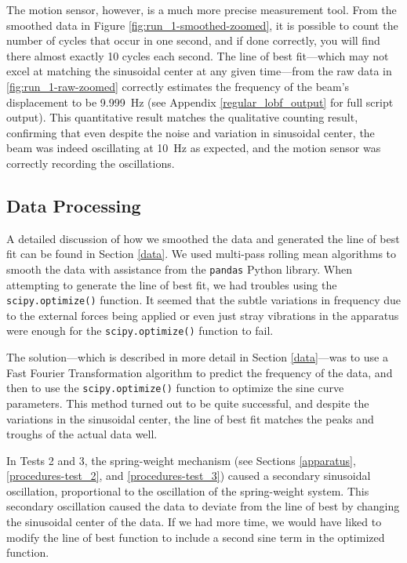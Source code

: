 \documentclass[12 pt]{report}
\begin{document}
The motion sensor, however, is a much more precise measurement tool. From the smoothed data in Figure \ref{fig:run_1-smoothed-zoomed}, it is possible to count the number of cycles that occur in one second, and if done correctly, you will find there almost exactly \num{10} cycles each second. The line of best fit---which may not excel at matching the sinusoidal center at any given time---from the raw data in \ref{fig:run_1-raw-zoomed} correctly estimates the frequency of the beam's displacement to be \qty{9.999}{\hertz} (see Appendix \ref{regular_lobf_output} for full script output). This quantitative result matches the qualitative counting result, confirming that even despite the noise and variation in sinusoidal center, the beam was indeed oscillating at \qty{10}{\hertz} as expected, and the motion sensor was correctly recording the oscillations.

\subsection{Data Processing} \label{analysis-data_processing}
A detailed discussion of how we smoothed the data and generated the line of best fit can be found in Section \ref{data}. We used multi-pass rolling mean algorithms to smooth the data with assistance from the \texttt{pandas} Python library. When attempting to generate the line of best fit, we had troubles using the \texttt{scipy.optimize()} function. It seemed that the subtle variations in frequency due to the external forces being applied or even just stray vibrations in the apparatus were enough for the \texttt{scipy.optimize()} function to fail.

The solution---which is described in more detail in Section \ref{data}---was to use a Fast Fourier Transformation algorithm to predict the frequency of the data, and then to use the \texttt{scipy.{\allowbreak}optimize()} function to optimize the sine curve parameters. This method turned out to be quite successful, and despite the variations in the sinusoidal center, the line of best fit matches the peaks and troughs of the actual data well.

In Tests \num{2} and \num{3}, the spring-weight mechanism (see Sections \ref{apparatus}, \ref{procedures-test_2}, and \ref{procedures-test_3}) caused a secondary sinusoidal oscillation, proportional to the oscillation of the spring-weight system. This secondary oscillation caused the data to deviate from the line of best by changing the sinusoidal center of the data. If we had more time, we would have liked to modify the line of best function to include a second sine term in the optimized function.
\end{document}
